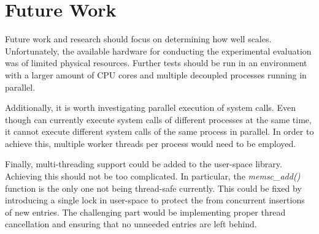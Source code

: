 \section{Future Work}

Future work and research should focus on determining how well \memsc scales.
Unfortunately, the available hardware for conducting the experimental
evaluation was of limited physical resources. Further tests should be run in an
environment with a larger amount of CPU cores and multiple decoupled processes
running in parallel.

Additionally, it is worth investigating parallel execution of system calls.
Even though \memsc can currently execute system calls of different processes at
the same time, it cannot execute different system calls of the same process in
parallel. In order to achieve this, multiple \memsc worker threads per process
would need to be employed.

Finally, multi-threading support could be added to the user-space \lib library.
Achieving this should not be too complicated. In particular, the
\emph{memsc\_add()} function is the only one not being thread-safe currently.
This could be fixed by introducing a single lock in user-space to protect the
\sysp from concurrent insertions of new entries. The challenging part would be
implementing proper thread cancellation and ensuring that no unneeded entries
are left behind.
